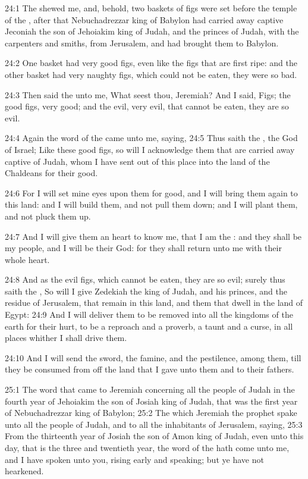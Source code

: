 24:1 The \LORD shewed me, and, behold, two baskets of figs were set
before the temple of the \LORD, after that Nebuchadrezzar king of
Babylon had carried away captive Jeconiah the son of Jehoiakim king of
Judah, and the princes of Judah, with the carpenters and smiths, from
Jerusalem, and had brought them to Babylon.

24:2 One basket had very good figs, even like the figs that are first
ripe: and the other basket had very naughty figs, which could not be
eaten, they were so bad.

24:3 Then said the \LORD unto me, What seest thou, Jeremiah? And I
said, Figs; the good figs, very good; and the evil, very evil, that
cannot be eaten, they are so evil.

24:4 Again the word of the \LORD came unto me, saying, 24:5 Thus saith
the \LORD, the God of Israel; Like these good figs, so will I
acknowledge them that are carried away captive of Judah, whom I have
sent out of this place into the land of the Chaldeans for their good.

24:6 For I will set mine eyes upon them for good, and I will bring
them again to this land: and I will build them, and not pull them
down; and I will plant them, and not pluck them up.

24:7 And I will give them an heart to know me, that I am the \LORD: and
they shall be my people, and I will be their God: for they shall
return unto me with their whole heart.

24:8 And as the evil figs, which cannot be eaten, they are so evil;
surely thus saith the \LORD, So will I give Zedekiah the king of Judah,
and his princes, and the residue of Jerusalem, that remain in this
land, and them that dwell in the land of Egypt: 24:9 And I will
deliver them to be removed into all the kingdoms of the earth for
their hurt, to be a reproach and a proverb, a taunt and a curse, in
all places whither I shall drive them.

24:10 And I will send the sword, the famine, and the pestilence, among
them, till they be consumed from off the land that I gave unto them
and to their fathers.

25:1 The word that came to Jeremiah concerning all the people of Judah
in the fourth year of Jehoiakim the son of Josiah king of Judah, that
was the first year of Nebuchadrezzar king of Babylon; 25:2 The which
Jeremiah the prophet spake unto all the people of Judah, and to all
the inhabitants of Jerusalem, saying, 25:3 From the thirteenth year of
Josiah the son of Amon king of Judah, even unto this day, that is the
three and twentieth year, the word of the \LORD hath come unto me, and
I have spoken unto you, rising early and speaking; but ye have not
hearkened.

